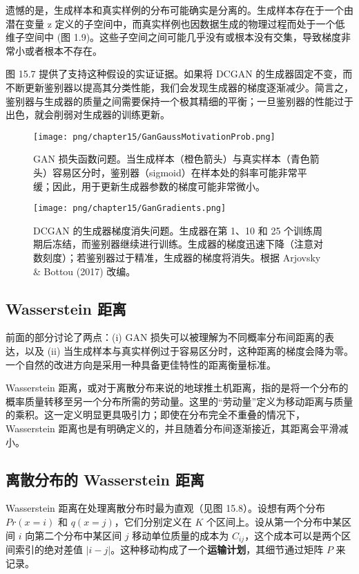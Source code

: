 遗憾的是，生成样本和真实样例的分布可能确实是分离的。生成样本存在于一个由潜在变量 z 定义的子空间中，而真实样例也因数据生成的物理过程而处于一个低维子空间中 (图 1.9)。这些子空间之间可能几乎没有或根本没有交集，导致梯度非常小或者根本不存在。

图 15.7 提供了支持这种假设的实证证据。如果将 DCGAN 的生成器固定不变，而不断更新鉴别器以提高其分类性能，我们会发现生成器的梯度逐渐减少。简言之，鉴别器与生成器的质量之间需要保持一个极其精细的平衡；一旦鉴别器的性能过于出色，就会削弱对生成器的训练更新。

\begin{figure}[ht!]
\centering
\texttt{[image: png/chapter15/GanGaussMotivationProb.png]}
\caption{GAN 损失函数问题。当生成样本（橙色箭头）与真实样本（青色箭头）容易区分时，鉴别器（sigmoid）在样本处的斜率可能非常平缓；因此，用于更新生成器参数的梯度可能非常微小。}
\end{figure}


\begin{figure}[ht!]
\centering
\texttt{[image: png/chapter15/GanGradients.png]}
\caption{DCGAN 的生成器梯度消失问题。生成器在第 1、10 和 25 个训练周期后冻结，而鉴别器继续进行训练。生成器的梯度迅速下降（注意对数刻度）；若鉴别器过于精准，生成器的梯度将消失。根据 Arjovsky \& Bottou (2017) 改编。}
\end{figure}


\subsection{Wasserstein 距离}
前面的部分讨论了两点：(i) GAN 损失可以被理解为不同概率分布间距离的表达，以及 (ii) 当生成样本与真实样例过于容易区分时，这种距离的梯度会降为零。一个自然的改进方向是采用一种具备更佳特性的距离衡量标准。

Wasserstein 距离，或对于离散分布来说的地球推土机距离，指的是将一个分布的概率质量转移至另一个分布所需的劳动量。这里的“劳动量”定义为移动距离与质量的乘积。这一定义明显更具吸引力；即使在分布完全不重叠的情况下，Wasserstein 距离也是有明确定义的，并且随着分布间逐渐接近，其距离会平滑减小。

\subsection{离散分布的 Wasserstein 距离}
Wasserstein 距离在处理离散分布时最为直观（见图 15.8）。设想有两个分布 \(Pr(x = i)\) 和 \(q(x = j)\)，它们分别定义在 \(K\) 个区间上。设从第一个分布中某区间 \(i\) 向第二个分布中某区间 \(j\) 移动单位质量的成本为 \(C_{ij}\)，这个成本可以是两个区间索引的绝对差值 \(|i - j|\)。这种移动构成了一个\textbf{运输计划}，其细节通过矩阵 \(P\) 来记录。

